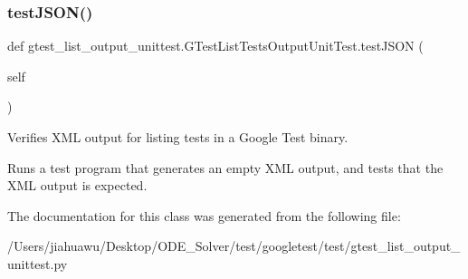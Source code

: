 \subsubsection{\texorpdfstring{test\+J\+S\+O\+N()}{testJSON()}}
{\footnotesize\ttfamily def gtest\+\_\+list\+\_\+output\+\_\+unittest.\+G\+Test\+List\+Tests\+Output\+Unit\+Test.\+test\+J\+S\+ON (\begin{DoxyParamCaption}\item[{}]{self }\end{DoxyParamCaption})}

\begin{DoxyVerb}Verifies XML output for listing tests in a Google Test binary.

Runs a test program that generates an empty XML output, and
tests that the XML output is expected.
\end{DoxyVerb}
 

The documentation for this class was generated from the following file\+:\begin{DoxyCompactItemize}
\item 
/\+Users/jiahuawu/\+Desktop/\+O\+D\+E\+\_\+\+Solver/test/googletest/test/gtest\+\_\+list\+\_\+output\+\_\+unittest.\+py\end{DoxyCompactItemize}
